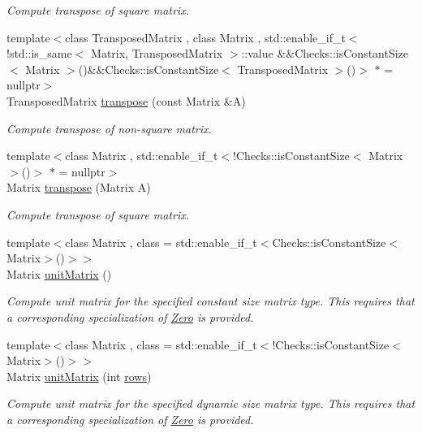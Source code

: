 \begin{DoxyCompactItemize}
\begin{DoxyCompactList}\small\item\em Compute transpose of square matrix. \end{DoxyCompactList}\item 
{\footnotesize template$<$class Transposed\+Matrix , class Matrix , std\+::enable\+\_\+if\+\_\+t$<$!std\+::is\+\_\+same$<$ Matrix, Transposed\+Matrix $>$\+::value \&\&\+Checks\+::is\+Constant\+Size$<$ Matrix $>$()\&\&\+Checks\+::is\+Constant\+Size$<$ Transposed\+Matrix $>$()$>$ $\ast$  = nullptr$>$ }\\Transposed\+Matrix \hyperlink{group__LinearAlgebraGroup_gaffe414459cb85a455a3c5a2099cfc6ee}{transpose} (const Matrix \&A)
\begin{DoxyCompactList}\small\item\em Compute transpose of non-\/square matrix. \end{DoxyCompactList}\item 
{\footnotesize template$<$class Matrix , std\+::enable\+\_\+if\+\_\+t$<$!\+Checks\+::is\+Constant\+Size$<$ Matrix $>$()$>$ $\ast$  = nullptr$>$ }\\Matrix \hyperlink{group__LinearAlgebraGroup_gac3427d39b75727a255e5ea387c50ff10}{transpose} (Matrix A)
\begin{DoxyCompactList}\small\item\em Compute transpose of square matrix. \end{DoxyCompactList}\item 
{\footnotesize template$<$class Matrix , class  = std\+::enable\+\_\+if\+\_\+t$<$\+Checks\+::is\+Constant\+Size$<$\+Matrix$>$()$>$$>$ }\\Matrix \hyperlink{group__LinearAlgebraGroup_ga88a596b8526c0ed98ce241244fb85948}{unit\+Matrix} ()
\begin{DoxyCompactList}\small\item\em Compute unit matrix for the specified constant size matrix type. This requires that a corresponding specialization of \hyperlink{structFunG_1_1Zero}{Zero} is provided. \end{DoxyCompactList}\item 
{\footnotesize template$<$class Matrix , class  = std\+::enable\+\_\+if\+\_\+t$<$!\+Checks\+::is\+Constant\+Size$<$\+Matrix$>$()$>$$>$ }\\Matrix \hyperlink{group__LinearAlgebraGroup_gae50c49f62ed072019079a7563688e5de}{unit\+Matrix} (int \hyperlink{namespaceFunG_1_1LinearAlgebra_abd3afa2fcd2194787342b2662cfa9f5a}{rows})
\begin{DoxyCompactList}\small\item\em Compute unit matrix for the specified dynamic size matrix type. This requires that a corresponding specialization of \hyperlink{structFunG_1_1Zero}{Zero} is provided. \end{DoxyCompactList}\item 

\end{DoxyCompactItemize}
